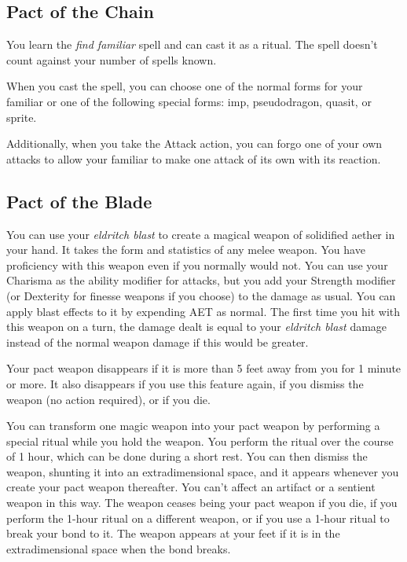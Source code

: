 \subsection{Pact of the Chain}

You learn the \textit{find familiar} spell and can cast it as a ritual. The spell doesn't count against your number of spells known.

When you cast the spell, you can choose one of the normal forms for your familiar or one of the following special forms: imp, pseudodragon, quasit, or sprite.

Additionally, when you take the Attack action, you can forgo one of your own attacks to allow your familiar to make one attack of its own with its reaction.

\subsection{Pact of the Blade}

You can use your \textit{eldritch blast} to create a magical weapon of solidified aether in your hand. It takes the form and statistics of any melee weapon. You have proficiency with this weapon even if you normally would not. You can use your Charisma as the ability modifier for attacks, but you add your Strength modifier (or Dexterity for finesse weapons if you choose) to the damage as usual. You can apply blast effects to it by expending AET as normal. The first time you hit with this weapon on a turn, the damage dealt is equal to your \textit{eldritch blast} damage instead of the normal weapon damage if this would be greater.

Your pact weapon disappears if it is more than 5 feet away from you for 1 minute or more. It also disappears if you use this feature again, if you dismiss the weapon (no action required), or if you die.

You can transform one magic weapon into your pact weapon by performing a special ritual while you hold the weapon. You perform the ritual over the course of 1 hour, which can be done during a short rest. You can then dismiss the weapon, shunting it into an extradimensional space, and it appears whenever you create your pact weapon thereafter. You can't affect an artifact or a sentient weapon in this way. The weapon ceases being your pact weapon if you die, if you perform the 1-hour ritual on a different weapon, or if you use a 1-hour ritual to break your bond to it. The weapon appears at your feet if it is in the extradimensional space when the bond breaks.

